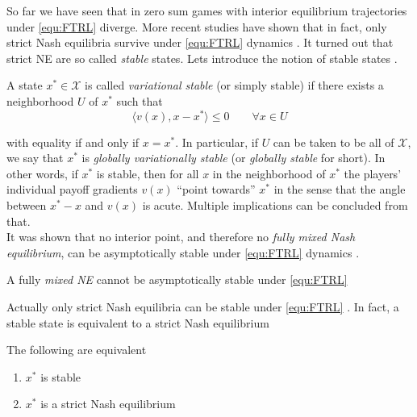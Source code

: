 So far we have seen that in zero sum games with interior equilibrium trajectories under \ref{equ:FTRL} diverge. More recent studies have shown that in fact, only strict Nash equilibria survive under \ref{equ:FTRL} dynamics \cite{flokas}. It turned out that strict NE are so called \textit{stable} states. Lets introduce the notion of stable states \cite[Def. 2.3]{mertikopoulos}. 

\begin{definition}\label{def:stability}
    A state $x^* \in \mathcal{X}$ is called \textit{variational stable} (or simply stable) if there exists a neighborhood $U$ of $x^*$ such that 
    \[\langle v(x),x-x^*\rangle \le 0 \qquad \forall x \in U\]
\end{definition}

with equality if and only if $x = x^*$. In particular, if $U$ can be taken to be all of $\mathcal{X}$, we say that $x^*$ is \textit{globally variationally stable} (or \textit{globally stable} for short). In other words, if $x^*$ is stable, then for all $x$ in the neighborhood of $x^*$ the players’ individual payoff gradients $v(x)$ “point towards” $x^*$ in the sense that the angle between $x^* - x$ and $v(x)$ is acute. Multiple implications can be concluded from that.\\

It was shown that no interior point, and therefore no \textit{fully mixed Nash equilibrium}, can be asymptotically stable under \ref{equ:FTRL} dynamics \cite[Theorem 1]{flokas}.  

\begin{proposition}\label{prop:noInteriorStable}
    A fully \textit{mixed NE} cannot be asymptotically stable under \ref{equ:FTRL}
\end{proposition}

Actually only strict Nash equilibria can be stable under \ref{equ:FTRL} \cite[Theorem 2]{flokas}. In fact, a stable state is equivalent to a strict Nash equilibrium \cite[Prop. 5.2]{mertikopoulos}

\begin{proposition}\label{prop:StrictStableEquivalent}
    The following are equivalent
    \begin{enumerate}
        \item $x^*$ is stable
        \item $x^*$ is a strict Nash equilibrium
    \end{enumerate}
\end{proposition}
    
